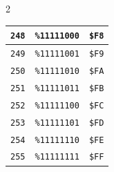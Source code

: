 \begin{multicols}{2}
\begin{center}
\begin{tabular}{|c|c|c|}
\hline \texttt{248} & \texttt{\%11111000} &  \texttt{\$F8} \\ \hline \texttt{249} & \texttt{\%11111001} &  \texttt{\$F9} \\ \hline \texttt{250} & \texttt{\%11111010} &  \texttt{\$FA} \\ \hline \texttt{251} & \texttt{\%11111011} &  \texttt{\$FB} \\ \hline \texttt{252} & \texttt{\%11111100} &  \texttt{\$FC} \\ \hline \texttt{253} & \texttt{\%11111101} &  \texttt{\$FD} \\ \hline \texttt{254} & \texttt{\%11111110} &  \texttt{\$FE} \\ \hline \texttt{255} & \texttt{\%11111111} &  \texttt{\$FF} \\ \hline
	\end{tabular}
\end{center}
\end{multicols}

\vspace*{\fill}

\normalsize

\cleardoublepage
